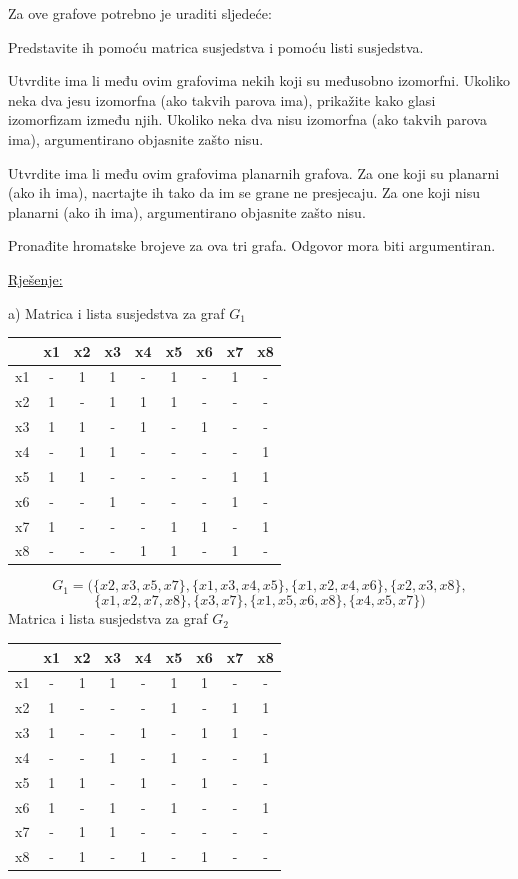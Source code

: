 \documentclass[12pt]{article}
\begin{document}
Za ove grafove potrebno je uraditi sljedeće:

Predstavite ih pomoću matrica susjedstva i pomoću listi susjedstva.

Utvrdite ima li među ovim grafovima nekih koji su međusobno izomorfni. Ukoliko neka dva jesu izomorfna (ako takvih parova ima), prikažite kako glasi izomorfizam između njih. Ukoliko neka dva nisu izomorfna (ako takvih parova ima), argumentirano objasnite zašto nisu.

Utvrdite ima li među ovim grafovima planarnih grafova. Za one koji su planarni (ako ih ima), nacrtajte ih tako da im se grane ne presjecaju. Za one koji nisu planarni (ako ih ima), argumentirano objasnite zašto nisu.

Pronađite hromatske brojeve za ova tri grafa. Odgovor mora biti argumentiran.

\underline{Rješenje:}

a) Matrica i lista susjedstva za graf $G_1$

\begin{tabular}{ | c || c  | c | c | c | c | c | c | c | }
\hline
 & x1 & x2 & x3 & x4 & x5 & x6 & x7 & x8\\
 \hline
 \hline
x1 & - & 1 & 1 & - & 1 & - & 1 & -\\
 \hline
x2 & 1 & - & 1 & 1 & 1 & - & - & -\\
 \hline
x3 & 1 & 1 & - & 1 & - & 1 & - & -\\
 \hline
x4 & - & 1 & 1 & - & - & - & - & 1\\
 \hline
x5 & 1 & 1 & - & - & - & - & 1 & 1\\
 \hline
x6 & - & - & 1 & - & - & - & 1 & -\\
 \hline
x7 & 1 & - & - & - & 1 & 1 & - & 1\\
 \hline
x8 & - & - & - & 1 & 1 & - & 1 & -\\
 \hline
\end{tabular}

$$G_1 = (\{ x2, x3, x5, x7 \}, \{x1, x3, x4, x5\}, \{x1, x2, x4, x6\}, \{x2, x3, x8\}, $$
$$\{ x1, x2, x7, x8\}, \{ x3, x7 \}, \{x1, x5, x6, x8\}, \{x4, x5, x7\})$$
\newpage
Matrica i lista susjedstva za graf $G_2$

\begin{tabular}{ | c || c  | c | c | c | c | c | c | c | }
\hline
 & x1 & x2 & x3 & x4 & x5 & x6 & x7 & x8\\
 \hline
 \hline
x1 & - & 1 & 1 & - & 1 & 1 & - & -\\
 \hline
x2 & 1 & - & - & - & 1 & - & 1 & 1\\
 \hline
x3 & 1 & - & - & 1 & - & 1 & 1 & -\\
 \hline
x4 & - & - & 1 & - & 1 & - & - & 1\\
 \hline
x5 & 1 & 1 & - & 1 & - & 1 & - & -\\
 \hline
x6 & 1 & - & 1 & - & 1 & - & - & 1\\
 \hline
x7 & - & 1 & 1 & - & - & - & - & -\\
 \hline
x8 & - & 1 & - & 1 & - & 1 & - & -\\
 \hline
\end{tabular}
\end{document}
